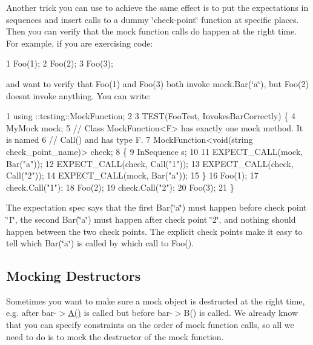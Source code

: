 Another trick you can use to achieve the same effect is to put the expectations in sequences and insert calls to a dummy \char`\"{}check-\/point\char`\"{} function at specific places. Then you can verify that the mock function calls do happen at the right time. For example, if you are exercising code\+:


\begin{DoxyCode}
1 Foo(1);
2 Foo(2);
3 Foo(3);
\end{DoxyCode}


and want to verify that {\ttfamily Foo(1)} and {\ttfamily Foo(3)} both invoke {\ttfamily mock.\+Bar(\char`\"{}a\char`\"{})}, but {\ttfamily Foo(2)} doesn\textquotesingle{}t invoke anything. You can write\+:


\begin{DoxyCode}
1 using ::testing::MockFunction;
2 
3 TEST(FooTest, InvokesBarCorrectly) \{
4   MyMock mock;
5   // Class MockFunction<F> has exactly one mock method.  It is named
6   // Call() and has type F.
7   MockFunction<void(string check\_point\_name)> check;
8   \{
9     InSequence s;
10 
11     EXPECT\_CALL(mock, Bar("a"));
12     EXPECT\_CALL(check, Call("1"));
13     EXPECT\_CALL(check, Call("2"));
14     EXPECT\_CALL(mock, Bar("a"));
15   \}
16   Foo(1);
17   check.Call("1");
18   Foo(2);
19   check.Call("2");
20   Foo(3);
21 \}
\end{DoxyCode}


The expectation spec says that the first {\ttfamily Bar(\char`\"{}a\char`\"{})} must happen before check point \char`\"{}1\char`\"{}, the second {\ttfamily Bar(\char`\"{}a\char`\"{})} must happen after check point \char`\"{}2\char`\"{}, and nothing should happen between the two check points. The explicit check points make it easy to tell which {\ttfamily Bar(\char`\"{}a\char`\"{})} is called by which call to {\ttfamily Foo()}.

\subsection*{Mocking Destructors}

Sometimes you want to make sure a mock object is destructed at the right time, e.\+g. after {\ttfamily bar-\/$>$\hyperlink{namespacetesting_a5e9134d655d2fc9323902348083282e7}{A()}} is called but before {\ttfamily bar-\/$>$B()} is called. We already know that you can specify constraints on the order of mock function calls, so all we need to do is to mock the destructor of the mock function.

